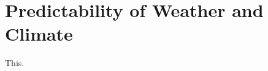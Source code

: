 \chapter{Predictability of Weather and Climate}
\label{ch:palmer_hagedorn}

This\citep{palmer_predictability_2006}.
